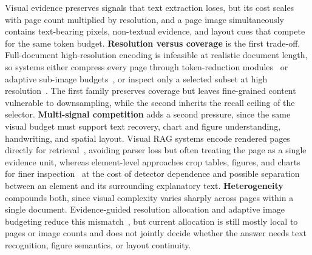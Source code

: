 \documentclass[11pt]{article}
\begin{document}
Visual evidence preserves signals that text extraction loses, but its cost scales with page count multiplied by resolution, and a page image simultaneously contains text-bearing pixels, non-textual evidence, and layout cues that compete for the same token budget. \textbf{Resolution versus coverage} is the first trade-off. Full-document high-resolution encoding is infeasible at realistic document length, so systems either compress every page through token-reduction modules~\cite{hu2025mplug2,yu2024texthawk2} or adaptive sub-image budgets~\cite{jia2024leopard}, or inspect only a selected subset at high resolution~\cite{zhu2025doclens,yan2025docseeker}. The first family preserves coverage but leaves fine-grained content vulnerable to downsampling, while the second inherits the recall ceiling of the selector. \textbf{Multi-signal competition} adds a second pressure, since the same visual budget must support text recovery, chart and figure understanding, handwriting, and spatial layout. Visual RAG systems encode rendered pages directly for retrieval~\cite{cho2024m3docrag,tanaka2025vdocrag}, avoiding parser loss but often treating the page as a single evidence unit, whereas element-level approaches crop tables, figures, and charts for finer inspection~\cite{zhu2025doclens} at the cost of detector dependence and possible separation between an element and its surrounding explanatory text. \textbf{Heterogeneity} compounds both, since visual complexity varies sharply across pages within a single document. Evidence-guided resolution allocation and adaptive image budgeting reduce this mismatch~\cite{yan2025docseeker,jia2024leopard}, but current allocation is still mostly local to pages or image counts and does not jointly decide whether the answer needs text recognition, figure semantics, or layout continuity.
\end{document}
